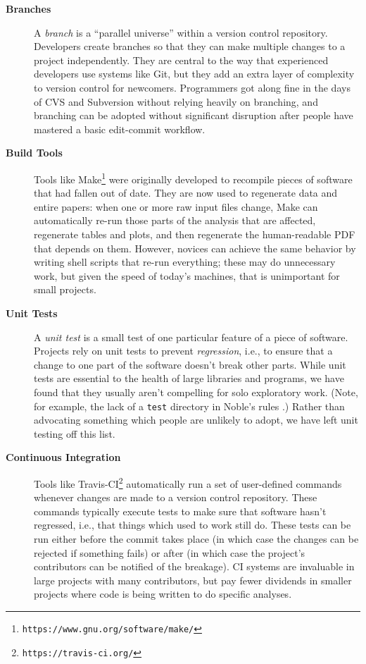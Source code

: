\documentclass[10pt]{article}
\newcommand{\withurl}[2]{{#1}\footnote{\texttt{#2}}}
\begin{document}
\begin{description}

\item[\textbf{Branches}]
  A \emph{branch} is a ``parallel universe'' within a version control
  repository. Developers create branches so that they can make
  multiple changes to a project independently. They are central to the
  way that experienced developers use systems like Git, but they add
  an extra layer of complexity to version control for newcomers.
  Programmers got along fine in the days of CVS and Subversion without
  relying heavily on branching, and branching can be adopted without
  significant disruption after people have mastered a basic
  edit-commit workflow.

\item[\textbf{Build Tools}] Tools like
  \withurl{Make}{https://www.gnu.org/software/make/} were originally
  developed to recompile pieces of software that had fallen out of
  date. They are now used to regenerate data and entire papers: when
  one or more raw input files change, Make can automatically re-run
  those parts of the analysis that are affected, regenerate tables and
  plots, and then regenerate the human-readable PDF that depends on
  them.  However, novices can achieve the same behavior by writing
  shell scripts that re-run everything; these may do unnecessary work,
  but given the speed of today's machines, that is unimportant for
  small projects.

\item[\textbf{Unit Tests}] A \emph{unit test} is a small test of one
  particular feature of a piece of software. Projects rely on unit
  tests to prevent \emph{regression}, i.e., to ensure that a change to
  one part of the software doesn't break other parts. While unit tests
  are essential to the health of large libraries and programs, we have
  found that they usually aren't compelling for solo exploratory
  work. (Note, for example, the lack of a \texttt{test} directory in
  Noble's rules \cite{noble2009}.)  Rather than advocating something
  which people are unlikely to adopt, we have left unit testing off
  this list.

\item[\textbf{Continuous Integration}] Tools like
  \withurl{Travis-CI}{https://travis-ci.org/} automatically run a set of
  user-defined commands whenever changes are made to a version control
  repository. These commands typically execute tests to make sure that
  software hasn't regressed, i.e., that things which used to work
  still do. These tests can be run either before the commit takes
  place (in which case the changes can be rejected if something fails)
  or after (in which case the project's contributors can be notified
  of the breakage). CI systems are invaluable in large projects with
  many contributors, but pay fewer dividends in smaller projects where
  code is being written to do specific analyses.


\end{description}
\end{document}
